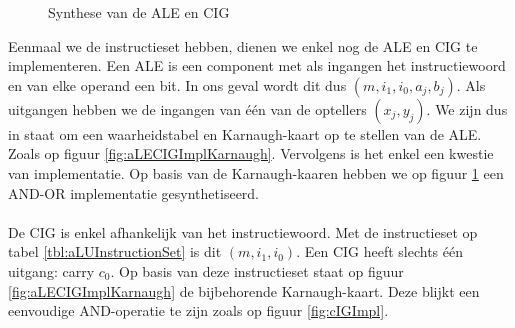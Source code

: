 \begin{figure}[hbt]
{
\label{fig:aLEImpl}}
\caption{Synthese van de ALE en CIG}
\end{figure}
Eenmaal we de instructieset hebben, dienen we enkel nog de ALE en CIG te implementeren. Een ALE is een component met als ingangen het instructiewoord en van elke operand een bit. In ons geval wordt dit dus $\left(m,i_1,i_0,a_j,b_j\right)$. Als uitgangen hebben we de ingangen van \'e\'en van de optellers $\left(x_j,y_j\right)$. We zijn dus in staat om een waarheidstabel en Karnaugh-kaart op te stellen van de ALE. Zoals op figuur \ref{fig:aLECIGImplKarnaugh}. Vervolgens is het enkel een kwestie van implementatie. Op basis van de Karnaugh-kaaren hebben we op figuur \ref{fig:aLEImpl} een AND-OR implementatie gesynthetiseerd.
\paragraph{}
De CIG is enkel afhankelijk van het instructiewoord. Met de instructieset op tabel \ref{tbl:aLUInstructionSet} is dit $\left(m,i_1,i_0\right)$. Een CIG heeft slechts \'e\'en uitgang: carry $c_0$. Op basis van deze instructieset staat op figuur \ref{fig:aLECIGImplKarnaugh} de bijbehorende Karnaugh-kaart. Deze blijkt een eenvoudige AND-operatie te zijn zoals op figuur \ref{fig:cIGImpl}.
